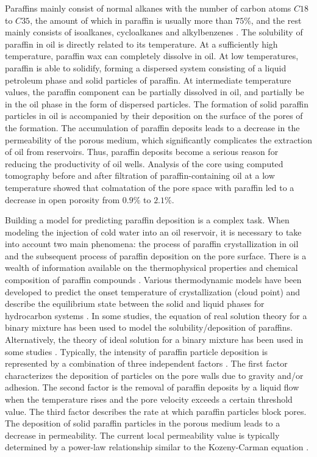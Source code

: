 \documentclass[
11pt,%
tightenlines,%
twoside,%
onecolumn,%
nofloats,%
nobibnotes,%
nofootinbib,%
superscriptaddress,%
noshowpacs,%
centertags]%
{revtex4-2}
\begin{document}
	Paraffins mainly consist of normal alkanes with the number of carbon atoms $C18$ to $C35$, the amount of which in paraffin is usually more than $75\%$, and the rest mainly consists of isoalkanes, cycloalkanes and alkylbenzenes \cite{2}. The solubility of paraffin in oil is directly related to its temperature. At a sufficiently high temperature, paraffin wax can completely dissolve in oil. At low temperatures, paraffin is able to solidify, forming a dispersed system consisting of a liquid petroleum phase and solid particles of paraffin. At intermediate temperature values, the paraffin component can be partially dissolved in oil, and partially be in the oil phase in the form of dispersed particles. The formation of solid paraffin particles in oil is accompanied by their deposition on the surface of the pores of the formation. The accumulation of paraffin deposits leads to a decrease in the permeability of the porous medium, which significantly complicates the extraction of oil from reservoirs. Thus, paraffin deposits become a serious reason for reducing the productivity of oil wells. Analysis of the core using computed tomography before and after filtration of paraffin-containing oil at a low temperature \cite{3} showed that colmatation of the pore space with paraffin led to a decrease in open porosity from $0.9\%$ to $2.1\%$.
	
	Building a model for predicting paraffin deposition is a complex task. When modeling the injection of cold water into an oil reservoir, it is necessary to take into account two main phenomena: the process of paraffin crystallization in oil and the subsequent process of paraffin deposition on the pore surface. There is a wealth of information available on the thermophysical properties and chemical composition of paraffin compounds \cite{4}. Various thermodynamic models have been developed to predict the onset temperature of crystallization (cloud point) and describe the equilibrium state between the solid and liquid phases for hydrocarbon systems \cite{2, 5, 6}. In some studies, the equation of real solution theory for a binary mixture has been used to model the solubility/deposition of paraffins. Alternatively, the theory of ideal solution for a binary mixture has been used in some studies \cite{7, 8}. Typically, the intensity of paraffin particle deposition is represented by a combination of three independent factors \cite{4, 5, 6, 9}. The first factor characterizes the deposition of particles on the pore walls due to gravity and/or adhesion. The second factor is the removal of paraffin deposits by a liquid flow when the temperature rises and the pore velocity exceeds a certain threshold value. The third factor describes the rate at which paraffin particles block pores. The deposition of solid paraffin particles in the porous medium leads to a decrease in permeability. The current local permeability value is typically determined by a power-law relationship similar to the Kozeny-Carman equation \cite{10}.
\end{document}
